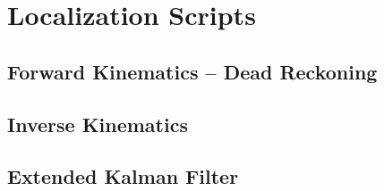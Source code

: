 \chapter{Localization Scripts}
\label{ap:d}

\section{Forward Kinematics -- Dead Reckoning}


\section{Inverse Kinematics}


\section{Extended Kalman Filter}

